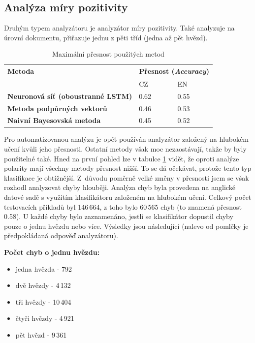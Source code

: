 \subsection{Analýza míry pozitivity}
Druhým typem analyzátoru je analyzátor míry pozitivity. Také analyzuje na úrovní dokumentu, přiřazuje jednu z pěti tříd (jedna až pět hvězd).
\FloatBarrier
\begin{table}[h!]
  \begin{center}
    \caption{Maximální přesnost použitých metod}
    \label{tab:table1.5}
    \begin{tabular}{l|l|l}
      \textbf{Metoda} &  \multicolumn{2}{l}{\textbf{Přesnost (\emph{Accuracy})}}\\ 
      \hline
      \textbf & CZ & EN \\ 
      \textbf{Neuronová síť (oboustranné LSTM)} & 0.62 & 0.55  \\ 
      \textbf{Metoda podpůrných vektorů} & 0.46 & 0.53 \\ 
      \textbf{Naivní Bayesovská metoda} & 0.45 & 0.52 \\ 
     \end{tabular}
  \end{center}
\end{table}
\FloatBarrier
Pro automatizovanou analýzu je opět používán analyzátor založený na hlubokém učení kvůli jeho přesnosti. Ostatní metody však moc nezaostávají, takže by byly použitelné také. Hned na první pohled lze v tabulce \ref{tab:table1.5} vidět, že oproti analýze polarity mají všechny metody přesnost nižší. To se dá očekávat, protože tento typ klasifikace je obtížnější. 
Z~důvodu poměrně velké změny v přesnosti jsem se však rozhodl analyzovat chyby hlouběji. Analýza chyb byla provedena na anglické datové sadě s využitím klasifikátoru založeném na hlubokém učení.
Celkový počet testovacích příkladů byl 146\,664, z toho bylo 60\,565 chyb (to znamená přesnost 0.58). U každé chyby bylo zaznamenáno, jestli se klasifikátor dopustil chyby pouze o jednu hvězdu nebo více. Výsledky jsou následující (nalevo od pomlčky je předpokládaná odpověď analyzátoru).

\textbf{Počet chyb o jednu hvězdu:}
\begin{itemize}
    \item jedna hvězda - 792
    \item dvě hvězdy - 4\,132
    \item tři hvězdy - 10\,404
    \item čtyři hvězdy - 4\,921
    \item pět hvězd - 9\,361
\end{itemize}

